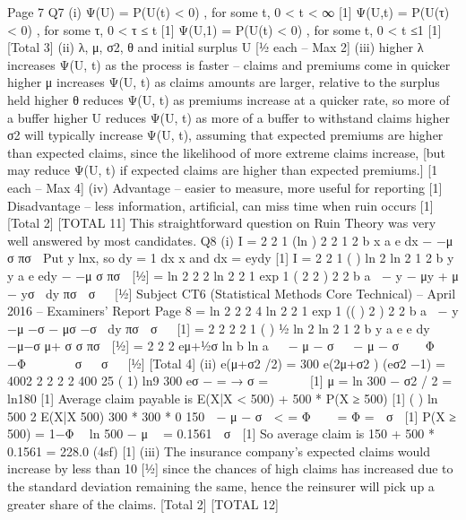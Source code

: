 \documentclass[a4paper,12pt]{article}
\begin{document}
Page 7
Q7 (i) Ψ(U) = P(U(t) < 0) , for some t, 0 < t < ∞ [1]
Ψ(U,t) = P(U(τ) < 0) , for some τ, 0 < τ ≤ t [1]
Ψ(U,1) = P(U(t) < 0) , for some t, 0 < t ≤1 [1]
[Total 3]
(ii) λ, μ, σ2, θ and initial surplus U [½ each – Max 2]
(iii) higher λ increases Ψ(U, t) as the process is faster – claims and premiums come in quicker
higher μ increases Ψ(U, t) as claims amounts are larger, relative to the surplus held
higher θ reduces Ψ(U, t) as premiums increase at a quicker rate, so more of a buffer
higher U reduces Ψ(U, t) as more of a buffer to withstand claims
higher σ2 will typically increase Ψ(U, t), assuming that expected premiums
are higher than expected claims, since the likelihood of more
extreme claims increase, [but may reduce Ψ(U, t) if expected claims
                          are higher than expected premiums.]
[1 each – Max 4]
(iv) Advantage – easier to measure, more useful for reporting [1]
Disadvantage – less information, artificial, can miss time when ruin occurs [1]
[Total 2]
[TOTAL 11]
This straightforward question on Ruin Theory was very well answered by
most candidates.
Q8 (i) I =
  2
2
1 (ln )
2
2
1
2
b x
a
e dx
− −μ
σ
πσ

Put y lnx, so dy = 1 dx
x
and dx = eydy [1]
I =
  2
2
1 ( ) ln 2
ln 2
1
2
b y y
a
e edy
− −μ
σ
πσ
 [½]
=
  ln 2 2 2
ln 2 2
1 exp 1 ( 2 2 )
2 2
b
a
− y − μy + μ − yσ dy
πσ  σ 
 [½]
Subject CT6 (Statistical Methods Core Technical) – April 2016 – Examiners’ Report
Page 8
=
  ln 2 2 2 4
ln 2 2
1 exp 1 (( ) 2 )
2 2
b
a
− y −μ −σ − μσ −σ dy
πσ  σ 
 [1]
=
  2 2
2 2
1 ( ) ½ ln 2
ln 2
1
2
b y
a
e e dy
−μ−σ
μ+ σ σ
πσ  [½]
= 2 2 2
eμ+½σ ln b ln a   − μ − σ   − μ − σ   Φ  −Φ     σ   σ  
[½]
[Total 4]
(ii)
e(μ+σ2 /2) = 300
e(2μ+σ2 ) (eσ2 −1) = 4002
2 2
2
2
400 25 ( 1) ln9 300
eσ − = → σ =  
 
[1]
μ = ln 300 − σ2 / 2 = ln180 [1]
Average claim payable is
E(X|X < 500) + 500 * P(X ≥ 500) [1]
( )
ln 500 2 E(X|X 500) 300 * 300 * 0 150
 − μ − σ  < = Φ   = Φ =  σ 
[1]
P(X ≥ 500) = 1−Φ  ln 500 − μ  = 0.1561  σ 
[1]
So average claim is 150 + 500 * 0.1561 = 228.0 (4sf) [1]
(iii) The insurance company’s expected claims would increase by less than 10%
[½]
since the chances of high claims has increased due to the standard deviation remaining the same, hence the reinsurer will pick up a greater share of the claims.%
[Total 2]
[TOTAL 12]
\end{document}
